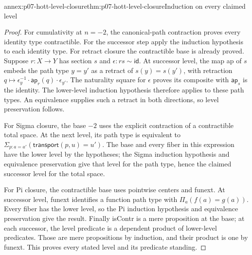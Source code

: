 \begin{annexitem}{annex:p07-hott-level-closure}{thm:p07-hott-level-closure}{Induction on every claimed level}
\begin{proof}
For cumulativity at $n=-2$, the canonical-path contraction proves
every identity type contractible. For the successor step apply
the induction hypothesis to each identity type.
For retract closure the contractible base is already proved.
Suppose $r:X\to Y$ has section $s$ and $\epsilon:r s\sim\mathsf{id}$.
At successor level, the map ap of $s$ embeds the path type $y=y'$
as a retract of $s(y)=s(y')$, with retraction
$q\mapsto\epsilon_y^{-1}\cdot\mathsf{ap}_r(q)\cdot\epsilon_{y'}$.
The naturality square for $\epsilon$ proves its composite with
$\mathsf{ap}_s$ is the identity. The lower-level induction hypothesis
therefore applies to these path types. An equivalence supplies such
a retract in both directions, so level preservation follows.

For Sigma closure, the base $-2$ uses the explicit contraction of a
contractible total space. At the next level, its path type is
equivalent to $\Sigma_{p:a=a'}(\mathsf{transport}(p,u)=u')$.
The base and every fiber in this expression have the lower level
by the hypotheses; the Sigma induction hypothesis and equivalence
preservation give that level for the path type, hence the claimed
successor level for the total space.

For Pi closure, the contractible base uses pointwise centers and
funext. At successor level, funext identifies a function path type
with $\Pi_a(f(a)=g(a))$. Every fiber has the lower level, so the
Pi induction hypothesis and equivalence preservation give the result.
Finally isContr is a mere proposition at the base; at each successor,
the level predicate is a dependent product of lower-level predicates.
Those are mere propositions by induction, and their product is one
by funext. This proves every stated level and its predicate standing.
\end{proof}
\end{annexitem}

